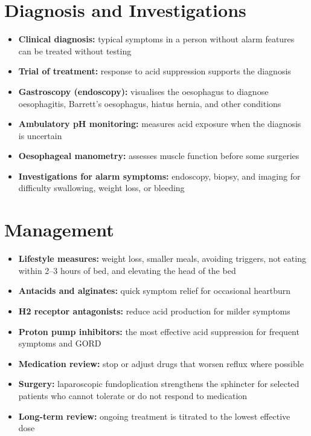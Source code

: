 \section*{Diagnosis and Investigations}
\begin{itemize}
    \item \textbf{Clinical diagnosis:} typical symptoms in a person without alarm features can be treated without testing
    \item \textbf{Trial of treatment:} response to acid suppression supports the diagnosis
    \item \textbf{Gastroscopy (endoscopy):} visualises the oesophagus to diagnose oesophagitis, Barrett's oesophagus, hiatus hernia, and other conditions
    \item \textbf{Ambulatory pH monitoring:} measures acid exposure when the diagnosis is uncertain
    \item \textbf{Oesophageal manometry:} assesses muscle function before some surgeries
    \item \textbf{Investigations for alarm symptoms:} endoscopy, biopsy, and imaging for difficulty swallowing, weight loss, or bleeding
\end{itemize}

\section*{Management}
\begin{itemize}
    \item \textbf{Lifestyle measures:} weight loss, smaller meals, avoiding triggers, not eating within 2--3 hours of bed, and elevating the head of the bed
    \item \textbf{Antacids and alginates:} quick symptom relief for occasional heartburn
    \item \textbf{H2 receptor antagonists:} reduce acid production for milder symptoms
    \item \textbf{Proton pump inhibitors:} the most effective acid suppression for frequent symptoms and GORD
    \item \textbf{Medication review:} stop or adjust drugs that worsen reflux where possible
    \item \textbf{Surgery:} laparoscopic fundoplication strengthens the sphincter for selected patients who cannot tolerate or do not respond to medication
    \item \textbf{Long-term review:} ongoing treatment is titrated to the lowest effective dose
\end{itemize}

